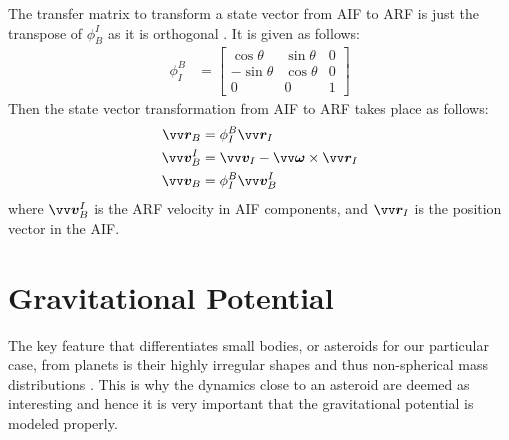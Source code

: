 %
\newline\newline
%
The transfer matrix to transform a state vector from \gls{AIF} to \gls{ARF} is just the transpose of $\phi_B^I$ as it is orthogonal \parencite{schaub2003Book}. It is given as follows:
\begin{align}
    \phi_{I}^{B} &=
    \begin{bmatrix}
        \cos\theta & \sin\theta & 0 \\
        -\sin\theta & \cos\theta & 0 \\
        0 & 0 & 1
    \end{bmatrix}
    \label{eqn:aif_to_arf_transformation matrix}
\end{align}
Then the state vector transformation from \gls{AIF} to \gls{ARF} takes place as follows:
\begin{align}
    \bvector{r}_B &= \phi_I^B \bvector{r}_I
    \label{eqn:aif_to_arf_position} \\
    \bvector{v}_B^I &= \bvector{v}_I - \bvector{\omega} \times \bvector{r}_I
    \label{eqn:aif_to_arf_transport_theorem} \\
    \bvector{v}_B &= \phi_I^B \bvector{v}_B^I
    \label{eqn:aif_to_arf_velocity}
\end{align}
where $\bvector{v}_B^I$ is the \gls{ARF} velocity in \gls{AIF} components, and $\bvector{r}_I$ is the position vector in the \gls{AIF}.

\section{Gravitational Potential}
\label{sec:gravity}
The key feature that differentiates small bodies, or asteroids for our particular case, from planets is their highly irregular shapes and thus non-spherical mass distributions \parencite{scheeresBook}. This is why the dynamics close to an asteroid are deemed as interesting and hence it is very important that the gravitational potential is modeled properly.

